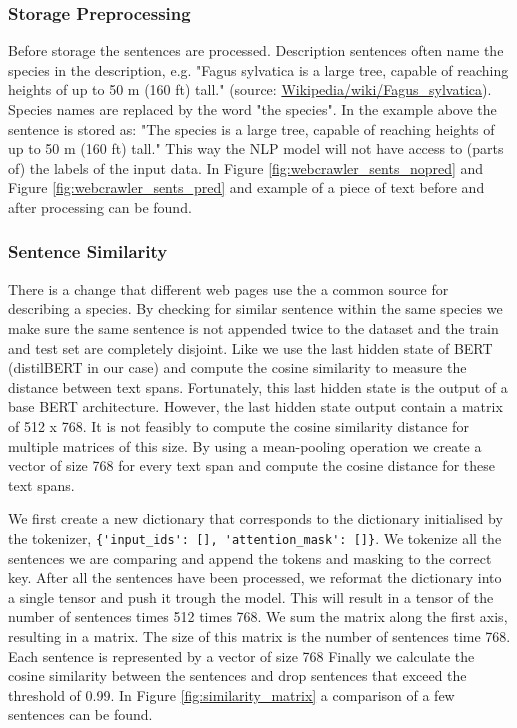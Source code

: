 \documentclass[a4paper, 12pt, oneside]{book} %
\begin{document}
\subsubsection{Storage Preprocessing} \label{Preprocessing}
Before storage the sentences are processed.
Description sentences often name the species in the description, e.g. "Fagus sylvatica is a large tree, capable of reaching heights of up to 50 m (160 ft) tall." (source: \href{https://en.wikipedia.org/wiki/Fagus_sylvatica}{Wikipedia/wiki/Fagus\_sylvatica}).
Species names are replaced by the word "the species". 
In the example above the sentence is stored as: "The species is a large tree, capable of reaching heights of up to 50 m (160 ft) tall."
This way the NLP model will not have access to (parts of) the labels of the input data. In Figure \ref{fig:webcrawler_sents_nopred} and Figure \ref{fig:webcrawler_sents_pred} and example of a piece of text before and after processing can be found.

\subsubsection{Sentence Similarity} \label{Sentence Similarity}
There is a change that different web pages use the a common source for describing a species.
By checking for similar sentence within the same species we make sure the same sentence is not appended twice to the dataset and the train and test set are completely disjoint.
Like \textcite{reimers_sentence-bert_2019} we use the last hidden state of BERT (distilBERT in our case) and compute the cosine similarity to measure the distance between text spans.
Fortunately, this last hidden state is the output of a base BERT architecture.
However, the last hidden state output contain a matrix of 512 x 768. 
It is not feasibly to compute the cosine similarity distance for multiple matrices of this size.
By using a mean-pooling operation we create a vector of size 768 for every text span and compute the cosine distance for these text spans.

We first create a new dictionary that corresponds to the dictionary initialised by the tokenizer, \verb|{'input_ids': [], 'attention_mask': []}|.
We tokenize all the sentences we are comparing and append the tokens and masking to the correct key.
After all the sentences have been processed, we reformat the dictionary into a single tensor and push it trough the model.
This will result in a tensor of the number of sentences times 512 times 768. 
We sum the matrix along the first axis, resulting in a matrix.
The size of this matrix is the number of sentences time 768.
Each sentence is represented by a vector of size 768
Finally we calculate the cosine similarity between the sentences and drop sentences that exceed the threshold of 0.99.
In Figure \ref{fig:similarity_matrix} a comparison of a few sentences can be found.
\end{document}
